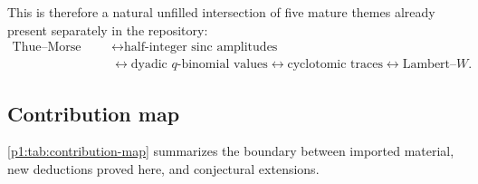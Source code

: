 \documentclass[11pt,oneside]{article}
\theoremstyle{definition}
\theoremstyle{remark}
\begin{document}
This is therefore a natural unfilled intersection of five mature themes already
present separately in the repository:
\[
\begin{aligned}
 \text{Thue--Morse signs}
 &\longleftrightarrow \text{half-integer sinc amplitudes}\\
 &\longleftrightarrow \text{dyadic }q\text{-binomial values}
 \longleftrightarrow \text{cyclotomic traces}
 \longleftrightarrow \text{Lambert--}W.
\end{aligned}
\]

\subsection{Contribution map}

\cref{p1:tab:contribution-map} summarizes the boundary between imported material,
new deductions proved here, and conjectural extensions.
\end{document}
